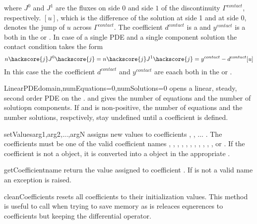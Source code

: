where $J^{0}$ and $J^{1}$ are the fluxes on side $0$ and side $1$ of the
discontinuity $\Gamma^{contact}$, respectively. $[u]$, which is the difference
of the solution at side 1 and at side 0, denotes the jump of $u$ across $\Gamma^{contact}$.
The coefficient $d^{contact}$ is a \RankTwo and $y^{contact}$ is a  
\RankOne both in the \FunctionOnContactZero or \FunctionOnContactOne.
In case of a single PDE and a single component solution the contact condition takes the form
\begin{equation}\label{LINEARPDE.SINGLE.6}
n\hackscore{j} J^{0}\hackscore{j}=n\hackscore{j} J^{1}\hackscore{j}=y^{contact} - d^{contact}[u]
\end{equation}
In this case the the coefficient $d^{contact}$ and $y^{contact}$ are eaach \Scalar
both in the \FunctionOnContactZero or \FunctionOnContactOne.
 
\begin{classdesc}{LinearPDE}{domain,numEquations=0,numSolutions=0}
opens a linear, steady, second order PDE on the \Domain {}. 
and  gives the number of equations and the number of solutiopn components.
If  and  is non-positive, the number of equations 
and the number solutions, respctively, stay undefined until a coefficient is
defined. 
\end{classdesc}

\begin{methoddesc}[LinearPDE]{setValues}{arg1,arg2,...,argN}
assigns new values to coefficients , , $\ldots$ . 
The coefficients must be one of the valid coefficient names
,
,
,
,
,
,
,
,
,
,
,
or .
If the coefficient is not a \Data object, it is converted into a \Data object in the
appropriate \FunctionSpace.
\end{methoddesc}

\begin{methoddesc}[LinearPDE]{getCoefficient}{name}
return the value assigned to coefficient . If  is not a valid name 
an exception is raised. 
\end{methoddesc}

\begin{methoddesc}[LinearPDE]{cleanCoefficients}{}
resets all coefficients to their initialization values. This method is useful to call when trying to save memory
as is releaces eqnerences to coefficients but keeping the differential operator.
\end{methoddesc}

